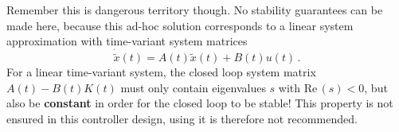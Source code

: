 \documentclass[a4paper,11pt,headinclude=true,headsepline,parskip=half,DIV=13]{scrartcl}
\begin{document}
Remember this is dangerous territory though.
No stability guarantees can be made here, because this ad-hoc solution corresponds to a linear system approximation with time-variant system matrices
$$
\dot{\tilde x}(t) = A(t)\tilde x(t) + B(t) u(t)\, .
$$
For a linear time-variant system, the closed loop system matrix $A(t) - B(t)K(t)$ must only contain eigenvalues $s$ with $\mathrm{Re}\,(s) < 0$, but also be \textbf{constant} in order for the closed loop to be stable!
This property is not ensured in this controller design, using it is therefore not recommended.

\printglossaries
\end{document}
